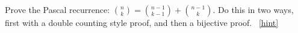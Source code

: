\documentclass{book}
\begin{document}
\setcounter{project}{99}
\addtocounter{project}{-1}
\begin{activity}[]\label{activity-92}
\hypertarget{p-738}{}%
Prove the Pascal recurrence: \(\binom{n}{k} = \binom{n - 1}{k-1} + \binom{n - 1}{k}\).  Do this in two ways, first with a double counting style proof, and then a bijective proof.%
~\hfill{\tiny\hyperlink{a-99}{[hint]}\hypertarget{q-99}{}}\end{activity}
\end{document}
